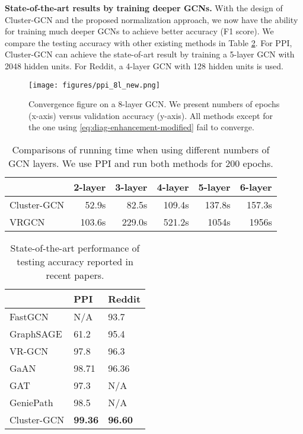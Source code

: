 \documentclass[sigconf]{acmart}
\begin{document}
{\bf State-of-the-art results by training deeper GCNs. }
With the design of Cluster-GCN and the proposed normalization approach, we now have the ability for training much deeper GCNs to achieve better accuracy (F1 score). 
We compare the testing accuracy with other existing methods in Table \ref{tab:stoa}.
For PPI, Cluster-GCN can achieve the state-of-art result by training a 5-layer GCN with 2048 hidden units.
For Reddit, a 4-layer GCN with 128 hidden units is used.

\begin{figure}
 \centering 
    \texttt{[image: figures/ppi\_8l\_new.png]}
    \caption{Convergence figure on a 8-layer GCN. We present numbers of epochs (x-axis) versus validation accuracy (y-axis). All methods except for the one using \eqref{eq:diag-enhancement-modified} fail to converge.}
    \label{fig:8layer}
    \vspace{-10pt}
\end{figure}




\begin{table}
\caption{Comparisons of running time when using different numbers of GCN layers. We use PPI and run both methods for 200 epochs.}
  \centering
  \renewcommand\bfdefault{b}
  \vspace{-10pt}\begin{tabular}{|l|r|r|r|r|r|}
  \hline
   & 2-layer & 3-layer & 4-layer & 5-layer & 6-layer\\
  \hline
Cluster-GCN   & 52.9s   & 82.5s   & 109.4s   & 137.8s   & 157.3s\\
  \hline
  VRGCN   & 103.6s   & 229.0s   & 521.2s   & 1054s  & 1956s\\
  \hline
\end{tabular}
\label{tab:deep}
\vspace{-10pt}
\end{table}
\begin{table}
\caption{State-of-the-art performance of testing accuracy reported in recent papers.}
\label{tab:stoa}
  \centering
  \vspace{-10pt}
  \renewcommand\bfdefault{b}
  \begin{tabular}{|l|l|l|}
  \hline
   & PPI & Reddit\\
  \hline
  FastGCN \cite{chen2018fastgcn} & N/A & 93.7\\
  \hline
  GraphSAGE \cite{hamilton2017inductive} & 61.2 & 95.4\\
  \hline
  VR-GCN \cite{chen2018stochastic} & 97.8 & 96.3\\
  \hline
  GaAN \cite{zhang2018gaan}& 98.71 & 96.36\\
  \hline
  GAT \cite{velickovic2018graph} & 97.3 & N/A\\
  \hline
  GeniePath \cite{liu2019geniepath} & 98.5 & N/A\\
  \hline
  Cluster-GCN & \textbf{99.36} & \textbf{96.60} \\
  \hline
\end{tabular}
\vspace{-10pt}
\end{table}
\end{document}
